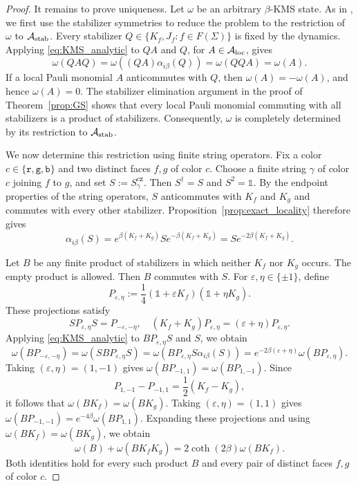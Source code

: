 \documentclass[a4paper,11pt]{article}
\theoremstyle{definition}
\theoremstyle{remark}
\theoremstyle{remark}
\begin{document}
\begin{proof}
    It remains to prove uniqueness. Let $\omega$ be an arbitrary $\beta$-KMS state. As in \cite[Section~2.2.2]{alicki2007statistical}, we first use the stabilizer symmetries to reduce the problem to the restriction of $\omega$ to $\mathcal A_{\rm stab}$. Every stabilizer $Q\in\{K_f,J_f:f\in F(\Sigma)\}$ is fixed by the dynamics. Applying \eqref{eq:KMS_analytic} to $QA$ and $Q$, for $A\in\mathcal A_{\rm loc}$, gives 
    \[
        \omega(QAQ)=\omega((QA)\alpha_{i\beta}(Q))=\omega(QQA)=\omega(A).
    \]
    If a local Pauli monomial $A$ anticommutes with $Q$, then $\omega(A)=-\omega(A)$, and hence $\omega(A)=0$. The stabilizer elimination argument in the proof of Theorem~\ref{prop:GS} shows that every local Pauli monomial commuting with all stabilizers is a product of stabilizers. Consequently, $\omega$ is completely determined by its restriction to $\mathcal A_{\rm stab}$.

    We now determine this restriction using finite string operators. Fix a color $c\in\{\mathtt r,\mathtt g,\mathtt b\}$ and two distinct faces $f,g$ of color $c$. Choose a finite string $\gamma$ of color $c$ joining $f$ to $g$, and set $S:=S_\gamma^{c\mathtt z}$. Then $S^\dagger=S$ and $S^2=\mathds{1}$. By the endpoint properties of the string operators, $S$ anticommutes with $K_f$ and $K_g$ and commutes with every other stabilizer. Proposition~\ref{prop:exact_locality} therefore gives 
    \[
        \alpha_{i\beta}(S)=e^{\beta(K_f+K_g)}Se^{-\beta(K_f+K_g)}=Se^{-2\beta(K_f+K_g)}.
    \]
    
    Let $B$ be any finite product of stabilizers in which neither $K_f$ nor $K_g$ occurs. The empty product is allowed. Then $B$ commutes with $S$. For $\varepsilon,\eta\in\{\pm1\}$, define 
    \[
        P_{\varepsilon,\eta}:=\frac14(\mathds{1}+\varepsilon K_f)(\mathds{1}+\eta K_g).
    \]
    These projections satisfy 
    \[
        SP_{\varepsilon,\eta}S=P_{-\varepsilon,-\eta}, \quad (K_f+K_g)P_{\varepsilon,\eta}=(\varepsilon+\eta)P_{\varepsilon,\eta}.
    \]
    Applying \eqref{eq:KMS_analytic} to $BP_{\varepsilon,\eta}S$ and $S$, we obtain
    \[
        \omega(BP_{-\varepsilon,-\eta})=\omega(SBP_{\varepsilon,\eta}S)=\omega(BP_{\varepsilon,\eta}S\alpha_{i\beta}(S))=e^{-2\beta(\varepsilon+\eta)}\omega(BP_{\varepsilon,\eta}).
    \]
    Taking $(\varepsilon,\eta)=(1,-1)$ gives $\omega(BP_{-1,1})=\omega(BP_{1,-1})$. Since 
    \[
        P_{1,-1}-P_{-1,1}=\frac{1}{2}(K_f-K_g),
    \]
    it follows that $\omega(BK_f)=\omega(BK_g)$. Taking $(\varepsilon,\eta)=(1,1)$ gives $\omega(BP_{-1,-1})=e^{-4\beta}\omega(BP_{1,1})$. Expanding these projections and using $\omega(BK_f)=\omega(BK_g)$, we obtain 
    \begin{equation} \label{eq:induction-step}
        \omega(B)+\omega(BK_fK_g)=2\coth(2\beta)\omega(BK_f).
    \end{equation}
    Both identities hold for every such product $B$ and every pair of distinct faces $f,g$ of color $c$.


\end{proof}
\end{document}
